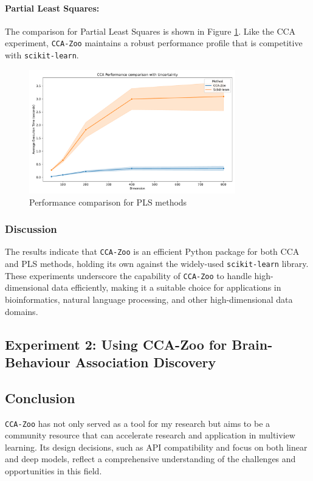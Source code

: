 \paragraph{Partial Least Squares:}
The comparison for Partial Least Squares is shown in Figure \ref{fig:pls_benchmark}.
Like the CCA experiment, \texttt{CCA-Zoo} maintains a robust performance profile that is competitive with \texttt{scikit-learn}.

\begin{figure}[h]
\centering
\includegraphics[width=0.8\textwidth]{figures/CCA_Speed_Benchmark}
\caption{Performance comparison for PLS methods}
\label{fig:pls_benchmark}
\end{figure}

\subsubsection{Discussion}

The results indicate that \texttt{CCA-Zoo} is an efficient Python package for both CCA and PLS methods, holding its own against the widely-used \texttt{scikit-learn} library.
These experiments underscore the capability of \texttt{CCA-Zoo} to handle high-dimensional data efficiently, making it a suitable choice for applications in bioinformatics, natural language processing, and other high-dimensional data domains.



\subsection{Experiment 2: Using CCA-Zoo for Brain-Behaviour Association Discovery}

\subsection{Conclusion}

\texttt{CCA-Zoo} has not only served as a tool for my research but aims to be a community resource that can accelerate research and application in multiview learning.
Its design decisions, such as API compatibility and focus on both linear and deep models, reflect a comprehensive understanding of the challenges and opportunities in this field.
